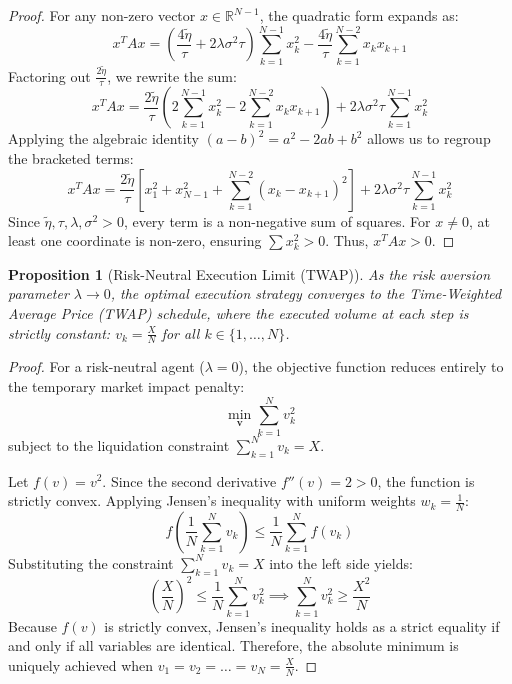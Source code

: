 \documentclass[11pt,a4paper]{article}
\newtheorem{proposition}[theorem]{Proposition}
\begin{document}
\begin{proof}
For any non-zero vector $x \in \mathbb{R}^{N-1}$, the quadratic form expands as:
\[ x^T A x = \left(\frac{4\tilde{\eta}}{\tau} + 2\lambda\sigma^2\tau\right)\sum_{k=1}^{N-1} x_k^2 - \frac{4\tilde{\eta}}{\tau} \sum_{k=1}^{N-2} x_k x_{k+1} \]
Factoring out $\frac{2\tilde{\eta}}{\tau}$, we rewrite the sum:
\[ x^T A x = \frac{2\tilde{\eta}}{\tau} \left( 2\sum_{k=1}^{N-1} x_k^2 - 2\sum_{k=1}^{N-2} x_k x_{k+1} \right) + 2\lambda\sigma^2\tau \sum_{k=1}^{N-1} x_k^2 \]
Applying the algebraic identity $(a-b)^2 = a^2 - 2ab + b^2$ allows us to regroup the bracketed terms:
\[ x^T A x = \frac{2\tilde{\eta}}{\tau} \left[ x_1^2 + x_{N-1}^2 + \sum_{k=1}^{N-2} (x_k - x_{k+1})^2 \right] + 2\lambda\sigma^2\tau \sum_{k=1}^{N-1} x_k^2 \]
Since $\tilde{\eta}, \tau, \lambda, \sigma^2 > 0$, every term is a non-negative sum of squares. For $x \neq 0$, at least one coordinate is non-zero, ensuring $\sum x_k^2 > 0$. Thus, $x^T A x > 0$.
\end{proof}

\begin{proposition}[Risk-Neutral Execution Limit (TWAP)]
As the risk aversion parameter $\lambda \to 0$, the optimal execution strategy converges to the Time-Weighted Average Price (TWAP) schedule, where the executed volume at each step is strictly constant: $v_k = \frac{X}{N}$ for all $k \in \{1, \dots, N\}$.
\end{proposition}

\begin{proof}
For a risk-neutral agent ($\lambda = 0$), the objective function reduces entirely to the temporary market impact penalty:
\[ \min_{\mathbf{v}} \sum_{k=1}^N v_k^2 \]
subject to the liquidation constraint $\sum_{k=1}^N v_k = X$.

Let $f(v) = v^2$. Since the second derivative $f''(v) = 2 > 0$, the function is strictly convex. Applying Jensen's inequality with uniform weights $w_k = \frac{1}{N}$:
\[ f\left( \frac{1}{N} \sum_{k=1}^N v_k \right) \le \frac{1}{N} \sum_{k=1}^N f(v_k) \]
Substituting the constraint $\sum_{k=1}^N v_k = X$ into the left side yields:
\[ \left( \frac{X}{N} \right)^2 \le \frac{1}{N} \sum_{k=1}^N v_k^2 \implies \sum_{k=1}^N v_k^2 \ge \frac{X^2}{N} \]
Because $f(v)$ is strictly convex, Jensen's inequality holds as a strict equality if and only if all variables are identical. Therefore, the absolute minimum is uniquely achieved when $v_1 = v_2 = \dots = v_N = \frac{X}{N}$.
\end{proof}
\end{document}
